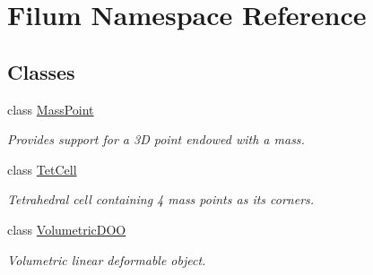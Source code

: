 \hypertarget{namespace_filum}{\section{Filum Namespace Reference}
\label{namespace_filum}
}
\subsection*{Classes}
\begin{DoxyCompactItemize}
\item 
class \hyperlink{class_filum_1_1_mass_point}{Mass\-Point}
\begin{DoxyCompactList}\small\item\em Provides support for a 3\-D point endowed with a mass. \end{DoxyCompactList}\item 
class \hyperlink{class_filum_1_1_tet_cell}{Tet\-Cell}
\begin{DoxyCompactList}\small\item\em Tetrahedral cell containing 4 mass points as its corners. \end{DoxyCompactList}\item 
class \hyperlink{class_filum_1_1_volumetric_d_o_o}{Volumetric\-D\-O\-O}
\begin{DoxyCompactList}\small\item\em Volumetric linear deformable object. \end{DoxyCompactList}\end{DoxyCompactItemize}
